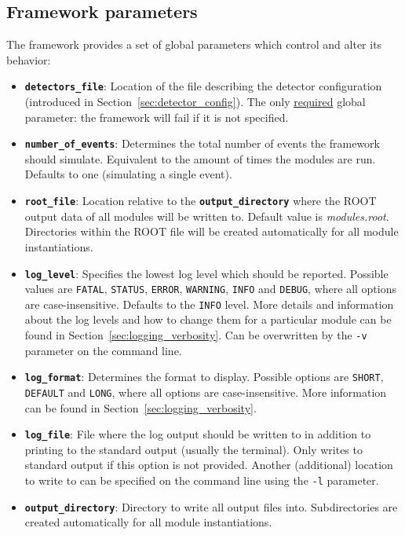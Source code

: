 \subsection{Framework parameters}
\label{sec:framework_parameters}
The \apsq framework provides a set of global parameters which control and alter its behavior:
\begin{itemize}
\item \textbf{\texttt{detectors\_file}}: Location of the file describing the detector configuration (introduced in Section~\ref{sec:detector_config}).
The only \underline{required} global parameter: the framework will fail if it is not specified.
\item \textbf{\texttt{number\_of\_events}}: Determines the total number of events the framework should simulate.
Equivalent to the amount of times the modules are run.
Defaults to one (simulating a single event).
\item \textbf{\texttt{root\_file}}: Location relative to the \textbf{\texttt{output\_directory}} where the ROOT output data of all modules will be written to.
Default value is \textit{modules.root}.
Directories within the ROOT file will be created automatically for all module instantiations.
\item \textbf{\texttt{log\_level}}: Specifies the lowest log level which should be reported.
Possible values are \texttt{FATAL}, \texttt{STATUS}, \texttt{ERROR}, \texttt{WARNING}, \texttt{INFO} and \texttt{DEBUG}, where all options are case-insensitive.
Defaults to the \texttt{INFO} level.
More details and information about the log levels and how to change them for a particular module can be found in Section~\ref{sec:logging_verbosity}.
Can be overwritten by the \texttt{-v} parameter on the command line.
\item \textbf{\texttt{log\_format}}: Determines the format to display.
Possible options are \texttt{SHORT}, \texttt{DEFAULT} and \texttt{LONG}, where all options are case-insensitive.
More information can be found in Section~\ref{sec:logging_verbosity}.
\item \textbf{\texttt{log\_file}}: File where the log output should be written to in addition to printing to the standard output (usually the terminal).
Only writes to standard output if this option is not provided.
Another (additional) location to write to can be specified on the command line using the \texttt{-l} parameter.
\item \textbf{\texttt{output\_directory}}: Directory to write all output files into.
Subdirectories are created automatically for all module instantiations.

\end{itemize}

